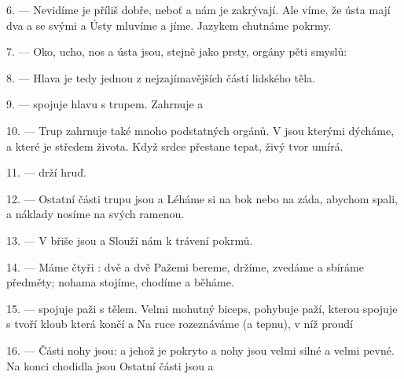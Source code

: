 6. --- Nevidíme je příliš dobře, neboť  a  nám je
zakrývají. Ale víme, že ústa mají dva   a
 se svými  a  Ústy mluvíme a jíme.
Jazykem chutnáme pokrmy.

7. --- Oko, ucho, nos a ústa jsou, stejně jako prsty, orgány pěti smyslů:
    

8. --- Hlava je tedy jednou z nejzajímavějších částí lidského těla.

\VUsaut{4.4mm}
\VUsaut{3.0mm}

9. ---  spojuje hlavu s trupem. Zahrnuje  a 

10. --- Trup zahrnuje také mnoho podstatných orgánů. V  jsou
 kterými dýcháme, a  které je středem života. Když
srdce přestane tepat, živý tvor umírá.

11. ---  drží hruď.

12. --- Ostatní části trupu jsou    a
 Léháme si na bok nebo na záda, abychom spali, a náklady nosíme na
svých ramenou.

13. --- V břiše jsou  a  Slouží nám k trávení
pokrmů.

\VUsaut{4.4mm}
\VUsaut{3.0mm}

14. --- Máme čtyři : dvě  a dvě  Pažemi
bereme, držíme, zvedáme a sbíráme předměty; nohama stojíme, chodíme a běháme.

15. ---  spojuje paži s tělem. Velmi mohutný  biceps,
pohybuje paží, kterou  spojuje s  
tvoří kloub  která končí  a  Na ruce
rozeznáváme  (a tepnu), v níž proudí 

16. --- Části nohy jsou:   a 
 jehož  je pokryto   a
  nohy jsou velmi silné a velmi pevné. Na konci
chodidla jsou  Ostatní části jsou  a

